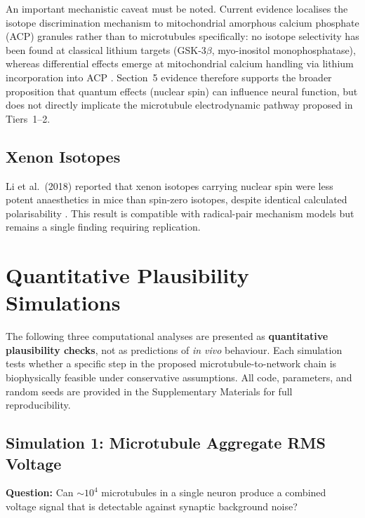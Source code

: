 \documentclass[10pt, a4paper, twocolumn]{article}
\begin{document}
An important mechanistic caveat must be noted. Current evidence
localises the isotope discrimination mechanism to mitochondrial
amorphous calcium phosphate (ACP) granules rather than to
microtubules specifically: no isotope selectivity has been found
at classical lithium targets (GSK-3$\beta$, myo-inositol
monophosphatase), whereas differential effects emerge at
mitochondrial calcium handling via lithium incorporation into
ACP \cite{esmaeilpour2023,wink2025}. Section~5 evidence
therefore supports the broader proposition that quantum effects
(nuclear spin) can influence neural function, but does not
directly implicate the microtubule electrodynamic pathway
proposed in Tiers~1--2.

\subsection{Xenon Isotopes}

Li et al.\ (2018) reported that xenon isotopes carrying nuclear spin
were less potent anaesthetics in mice than spin-zero isotopes, despite
identical calculated polarisability \cite{li2018xenon}. This result is
compatible with radical-pair mechanism models but remains a single
finding requiring replication.

\section{Quantitative Plausibility Simulations}
\label{sec:simulations}

The following three computational analyses are presented as
\textbf{quantitative plausibility checks}, not as predictions of
\emph{in vivo} behaviour. Each simulation tests whether a specific
step in the proposed microtubule-to-network chain is biophysically
feasible under conservative assumptions. All code, parameters, and
random seeds are provided in the Supplementary Materials for full
reproducibility.

\subsection{Simulation 1: Microtubule Aggregate RMS Voltage}
\label{sec:sim1}

\textbf{Question:} Can $\sim\!10^4$ microtubules in a single neuron
produce a combined voltage signal that is detectable against synaptic
background noise?
\end{document}
